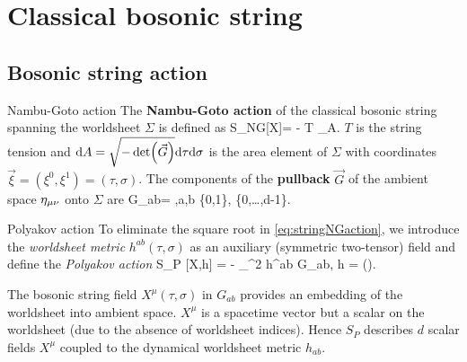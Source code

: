 \section{Classical bosonic string}
\subsection{Bosonic string action}
\begin{mybox}{Nambu-Goto action }
	 The \textbf{Nambu-Goto action} of the classical bosonic string spanning the worldsheet $\Sigma$ is defined as
	\be 
	\label{eq:stringNGaction}
	S_{NG}[X]= - T \int_\Sigma \md A.
	\ee 
	$T$ is the string tension and $\mathrm{d} A=\sqrt{-\det(\vec{G})}\mathrm{d} \tau \mathrm{d} \sigma$ is the area element of $\Sigma$ with coordinates $\vec{\xi}=(\xi^0,\xi^1)=(\tau,\sigma)$. The components of the \textbf{pullback} $\vec{G}$ of the ambient space $\eta_{\mu \nu}$ onto $\Sigma$ are 
	\be 
	\label{eq:stringPullback}
	G_{ab}=  ,\quad  a,b \in \{0,1\}, \; \mu \in \{0,\dots,d-1\}.
	\ee 
	\end{mybox} 
\begin{mybox}{Polyakov action}
	To eliminate the square root in \ref{eq:stringNGaction}, we introduce the \emph{worldsheet metric } $h^{ab}(\tau,\sigma)$ as an auxiliary (symmetric two-tensor) field and define the \emph{Polyakov action} 
	\be 
	\label{eq:stringPaction}
	S_P [X,h] = - \int_\Sigma \md^2 \xi {} h^{ab} G_{ab},\quad {} h = \det().
		\ee 
\end{mybox}
The bosonic string field $X^\mu(\tau,\sigma)$ in $G_{ab}$ provides an embedding of the worldsheet into ambient space. $X^\mu$ is a spacetime vector but a scalar on the worldsheet (due to the absence of worldsheet indices). Hence $S_P$ describes $d$ scalar fields $X^\mu$ coupled to the dynamical worldsheet metric $h_{ab}$. 
